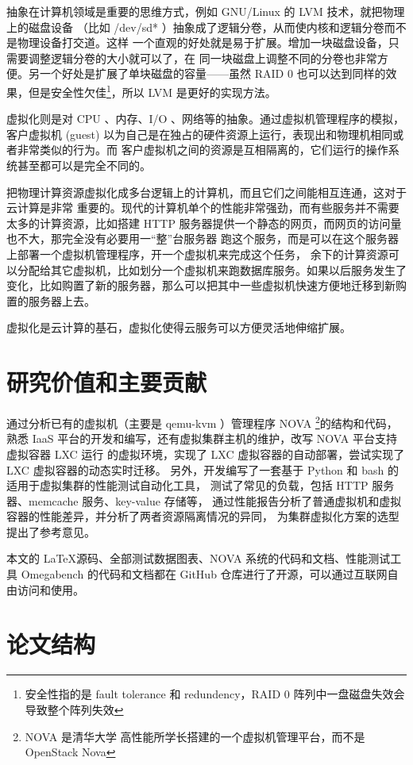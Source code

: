 抽象在计算机领域是重要的思维方式，例如 GNU/Linux 的 LVM 技术，就把物理上的磁盘设备
（比如 /dev/sd* ）抽象成了逻辑分卷，从而使内核和逻辑分卷而不是物理设备打交道。这样
一个直观的好处就是易于扩展。增加一块磁盘设备，只需要调整逻辑分卷的大小就可以了，在
同一块磁盘上调整不同的分卷也非常方便。另一个好处是扩展了单块磁盘的容量——虽然 RAID 0
也可以达到同样的效果，但是安全性欠佳\footnote{安全性指的是 fault tolerance 和
 redundency，RAID 0 阵列中一盘磁盘失效会导致整个阵列失效}，所以 LVM 是更好的实现方法。

虚拟化则是对 CPU 、内存、I/O 、网络等的抽象。通过虚拟机管理程序的模拟，客户虚拟机
(guest) 以为自己是在独占的硬件资源上运行，表现出和物理机相同或者非常类似的行为。而
客户虚拟机之间的资源是互相隔离的，它们运行的操作系统甚至都可以是完全不同的。

把物理计算资源虚拟化成多台逻辑上的计算机，而且它们之间能相互连通，这对于云计算是非常
重要的。现代的计算机单个的性能非常强劲，而有些服务并不需要太多的计算资源，比如搭建
HTTP 服务器提供一个静态的网页，而网页的访问量也不大，那完全没有必要用一“整”台服务器
跑这个服务，而是可以在这个服务器上部署一个虚拟机管理程序，开一个虚拟机来完成这个任务，
余下的计算资源可以分配给其它虚拟机，比如划分一个虚拟机来跑数据库服务。如果以后服务发生了
变化，比如购置了新的服务器，那么可以把其中一些虚拟机快速方便地迁移到新购置的服务器上去。

虚拟化是云计算的基石，虚拟化使得云服务可以方便灵活地伸缩扩展。

\section{研究价值和主要贡献}

通过分析已有的虚拟机（主要是 qemu-kvm ）管理程序 NOVA \footnote{NOVA 是清华大学
高性能所学长搭建的一个虚拟机管理平台，而不是 OpenStack Nova }的结构和代码，熟悉
IaaS 平台的开发和编写，还有虚拟集群主机的维护，改写 NOVA 平台支持虚拟容器 LXC 运行
的虚拟环境，实现了 LXC 虚拟容器的自动部署，尝试实现了 LXC 虚拟容器的动态实时迁移。
另外，开发编写了一套基于 Python 和 bash 的适用于虚拟集群的性能测试自动化工具，
测试了常见的负载，包括 HTTP 服务器、memcache 服务、key-value 存储等，
通过性能报告分析了普通虚拟机和虚拟容器的性能差异，并分析了两者资源隔离情况的异同，
为集群虚拟化方案的选型提出了参考意见。

本文的 \LaTeX 源码、全部测试数据图表、NOVA 系统的代码和文档、性能测试工具 Omegabench
的代码和文档都在 GitHub 仓库进行了开源，可以通过互联网自由访问和使用。

\section{论文结构}

